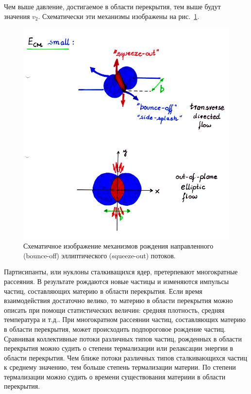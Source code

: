 Чем выше давление, достигаемое в области перекрытия, тем выше будут значения $v_2$.
Схематически эти механизмы изображены на рис.~\ref{fig:bounce_off}.
%
\begin{figure}[ht]
\begin{center}
    \includegraphics[width=0.75\linewidth]{images/bounce_off.jpg}
    \caption{Схематичное изображение механизмов рождения направленного (bounce-off) эллиптического (squeeze-out) потоков.}
    \label{fig:bounce_off}
\end{center}
\end{figure}
%

Партисипанты, или нуклоны сталкиващихся ядер, претерпевают многократные рассеяния.
В результате рождаются новые частицы и изменяются импульсы частиц, составляющих материю в области перекрытия.
Если время взаимодействия достаточно велико, то материю в области перекрытия можно описать при помощи статистических величин: средняя плотность, средняя температура и т.д..
При многократном рассеянии частиц, составляющих материю в области перекрытия, может происходить подпороговое рождение частиц.
Сравнивая коллективные потоки различных типов частиц, рожденных в области перекрытия можно судить о степени термализации или релаксации энергии в области перекрытия.
Чем ближе потоки различных типов сталкивающихся частиц к среднему значению, тем больше степень термализации материи.
По степени термализации можно судить о времени существования материии в области перекрытия.  

